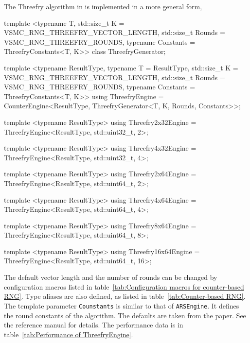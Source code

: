 The Threefry algorithm in \textcite{Salmon:2011um} is implemented in a more
general form,
\begin{cppcode}
  template <typename T, std::size_t K = VSMC_RNG_THREEFRY_VECTOR_LENGTH,
      std::size_t Rounds = VSMC_RNG_THREEFRY_ROUNDS,
      typename Constants = ThreefryConstants<T, K>>
  class ThreefryGenerator;

  template <typename ResultType, typename T = ResultType,
      std::size_t K = VSMC_RNG_THREEFRY_VECTOR_LENGTH,
      std::size_t Rounds = VSMC_RNG_THREEFRY_ROUNDS,
      typename Constants = ThreefryConstants<T, K>>
  using ThreefryEngine =
      CounterEngine<ResultType, ThreefryGenerator<T, K, Rounds, Constants>>;

  template <typename ResultType>
  using Threefry2x32Engine = ThreefryEngine<ResultType, std::uint32_t, 2>;

  template <typename ResultType>
  using Threefry4x32Engine = ThreefryEngine<ResultType, std::uint32_t, 4>;

  template <typename ResultType>
  using Threefry2x64Engine = ThreefryEngine<ResultType, std::uint64_t, 2>;

  template <typename ResultType>
  using Threefry4x64Engine = ThreefryEngine<ResultType, std::uint64_t, 4>;

  template <typename ResultType>
  using Threefry8x64Engine = ThreefryEngine<ResultType, std::uint64_t, 8>;

  template <typename ResultType>
  using Threefry16x64Engine = ThreefryEngine<ResultType, std::uint64_t, 16>;
\end{cppcode}
The default vector length and the number of rounds can be changed by
configuration macros listed in table~\ref{tab:Configuration macros for
  counter-based RNG}. Type aliases are also defined, as listed in
table~\ref{tab:Counter-based RNG}. The template parameter \verb|Counstants| is
similar to that of \verb|ARSEngine|. It defines the round constants of the
algorithm. The defaults are taken from the paper. See the reference manual for
details. The performance data is in table~\ref{tab:Performance of
  ThreefryEngine}.

